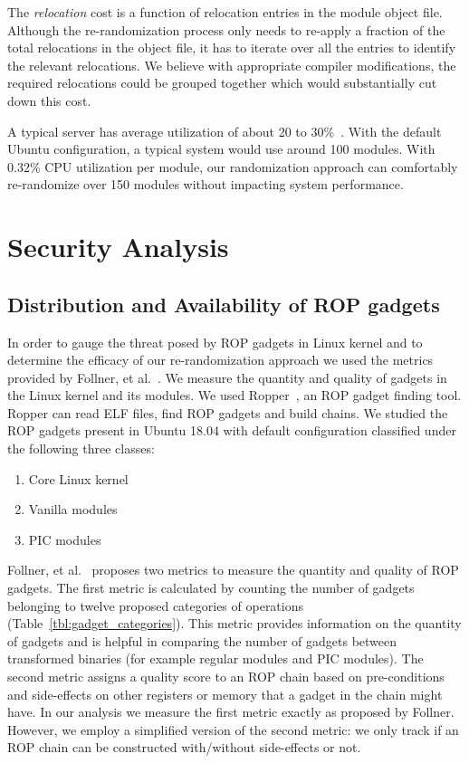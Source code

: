 The \textit{relocation} cost is a function of relocation entries in the module object file. Although the re-randomization process only needs to re-apply a fraction of the total relocations in the object file, it has to iterate over all the entries to identify the relevant relocations. We believe with appropriate compiler modifications, the required relocations could be grouped together which would substantially cut down this cost.

A typical server has average utilization of about 20 to 30\%~\cite{bohrer2002case,33387}. With the default Ubuntu configuration, a typical system would use around 100 modules. With 0.32\% CPU utilization per module, our randomization approach can comfortably re-randomize over 150 modules without impacting system performance.


\section{Security Analysis}\label{se:eval_security}
\subsection{Distribution and Availability of ROP gadgets}
In order to gauge the threat posed by ROP gadgets in Linux kernel and to determine the efficacy of our re-randomization approach we used the metrics provided by Follner, et al.~\cite{follner2016analyzing}. We measure the quantity and quality of gadgets in the Linux kernel and its modules. We used Ropper~\cite{schirra_2019}, an ROP gadget finding tool. Ropper can read ELF files, find ROP gadgets and build chains. We studied the ROP gadgets present in Ubuntu 18.04 with default configuration classified under the following three classes:

\begin{enumerate}[noitemsep]
    \item Core Linux kernel
    \item Vanilla modules
    \item PIC modules
\end{enumerate}

Follner, et al.~\cite{follner2016analyzing} proposes two metrics to measure the quantity and quality of ROP gadgets. The first metric is calculated by counting the number of gadgets belonging to twelve proposed categories of operations (Table~\ref{tbl:gadget_categories}). This metric provides information on the quantity of gadgets and is helpful in comparing the number of gadgets between transformed binaries (for example regular modules and PIC modules). The second metric assigns a quality score to an ROP chain based on pre-conditions and side-effects on other registers or memory that a gadget in the chain might have. In our analysis we measure the first metric exactly as proposed by Follner. However, we employ a simplified version of the second metric: we only track if an ROP chain can be constructed with/without side-effects or not.

